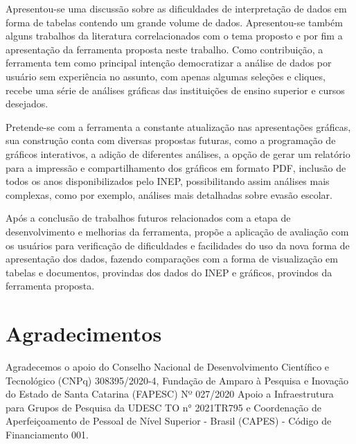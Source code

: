 \documentclass[12pt]{article}
\begin{document}
Apresentou-se uma discussão sobre as dificuldades de interpretação de dados em forma de tabelas contendo um grande volume de dados. Apresentou-se também alguns trabalhos da literatura correlacionados com o tema proposto e por fim a apresentação da ferramenta proposta neste trabalho. Como contribuição, a ferramenta tem como principal intenção democratizar a análise de dados por usuário sem experiência no assunto, com apenas algumas seleções e cliques, recebe uma série de análises gráficas das instituições de ensino superior e cursos desejados.

Pretende-se com a ferramenta a constante atualização nas apresentações gráficas, sua construção conta com diversas propostas futuras, como a programação de gráficos interativos, a adição de diferentes análises, a opção de gerar um relatório para a impressão e compartilhamento dos gráficos em formato PDF, inclusão de todos os anos disponibilizados pelo INEP, possibilitando assim análises mais complexas, como por exemplo, análises mais detalhadas sobre evasão escolar. 


Após a conclusão de trabalhos futuros relacionados com a etapa de desenvolvimento e melhorias da ferramenta, propõe a aplicação de avaliação com os usuários para verificação de dificuldades e facilidades do uso da nova forma de apresentação dos dados, fazendo comparações com a forma de visualização em tabelas e documentos, provindas dos dados do INEP e gráficos, provindos da ferramenta proposta.

\section{Agradecimentos}
Agradecemos o apoio do Conselho Nacional de Desenvolvimento Científico e Tecnológico (CNPq) 308395/2020-4,  Fundação de Amparo à Pesquisa e Inovação do Estado de Santa Catarina (FAPESC) Nº 027/2020 Apoio a Infraestrutura para Grupos de Pesquisa da UDESC TO n° 2021TR795 e Coordenação de Aperfeiçoamento de Pessoal de Nível Superior - Brasil (CAPES) - Código de Financiamento 001.






\end{document}
